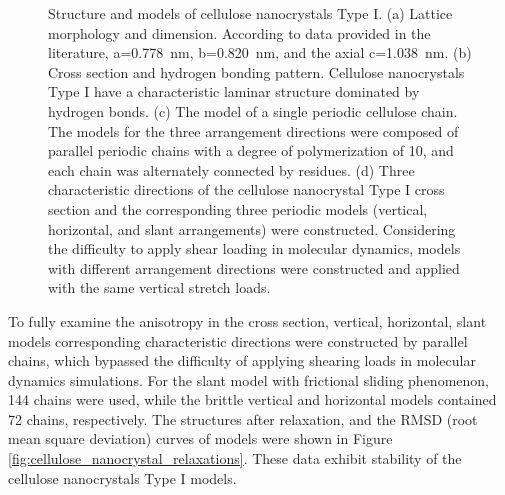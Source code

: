 \documentclass{article}
\begin{document}
\begin{figure}[htbp]
    \captionsetup{font=scriptsize}
    \caption{
    Structure and models of cellulose nanocrystals Type I.
    (a) Lattice morphology and dimension.
    According to data provided in the literature, a=0.778~nm, b=0.820~nm, and the axial c=1.038~nm.
    (b) Cross section and hydrogen bonding pattern.
    Cellulose nanocrystals Type I have a characteristic laminar structure dominated by hydrogen bonds.
    (c) The model of a single periodic cellulose chain.
    The models for the three arrangement directions were composed of parallel periodic chains with a degree of polymerization of 10, and each chain was alternately connected by residues.
    (d) Three characteristic directions of the cellulose nanocrystal Type I cross section and the corresponding three periodic models (vertical, horizontal, and slant arrangements) were constructed.
    Considering the difficulty to apply shear loading in molecular dynamics, models with different arrangement directions were constructed and applied with the same vertical stretch loads.
    }
    \label{fig:cellulose_nanocrystal_structure_and_models}
\end{figure}

\clearpage

To fully examine the anisotropy in the cross section, vertical, horizontal, slant models corresponding characteristic directions were constructed by parallel chains, which bypassed the difficulty of applying shearing loads in molecular dynamics simulations.
For the slant model with frictional sliding phenomenon, 144 chains were used, while the brittle vertical and horizontal models contained 72 chains, respectively.
The structures after relaxation, and the RMSD (root mean square deviation) curves of models were shown in Figure \ref{fig:cellulose_nanocrystal_relaxations}.
These data exhibit stability of the cellulose nanocrystals Type I models.
\end{document}
